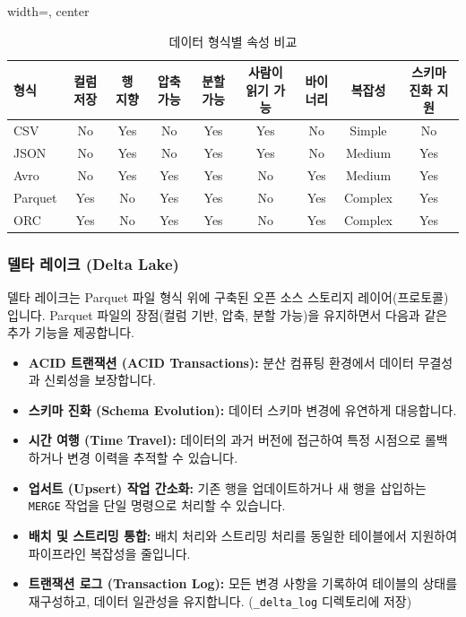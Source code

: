 \documentclass[11pt,a4paper]{article}
\theoremstyle{definition}
\newcommand{\code}[1]{\texttt{#1}}
\begin{document}
\begin{table}[h!]
\centering
\caption{데이터 형식별 속성 비교}
\label{tab:data_format_properties}
\begin{adjustbox}{width=\textwidth, center}
\begin{tabular}{lcccccccc}
\toprule
\textbf{형식} & \textbf{컬럼 저장} & \textbf{행 지향} & \textbf{압축 가능} & \textbf{분할 가능} & \textbf{사람이 읽기 가능} & \textbf{바이너리} & \textbf{복잡성} & \textbf{스키마 진화 지원} \\
\midrule
CSV & No & Yes & No & Yes & Yes & No & Simple & No \\
JSON & No & Yes & No & Yes & Yes & No & Medium & Yes \\
Avro & No & Yes & Yes & Yes & No & Yes & Medium & Yes \\
Parquet & Yes & No & Yes & Yes & No & Yes & Complex & Yes \\
ORC & Yes & No & Yes & Yes & No & Yes & Complex & Yes \\
\bottomrule
\end{tabular}
\end{adjustbox}
\end{table}

\subsubsection{델타 레이크 (Delta Lake)}
델타 레이크는 Parquet 파일 형식 위에 구축된 오픈 소스 스토리지 레이어(프로토콜)입니다. Parquet 파일의 장점(컬럼 기반, 압축, 분할 가능)을 유지하면서 다음과 같은 추가 기능을 제공합니다.

\begin{itemize}
    \item \textbf{ACID 트랜잭션 (ACID Transactions):} 분산 컴퓨팅 환경에서 데이터 무결성과 신뢰성을 보장합니다.
    \item \textbf{스키마 진화 (Schema Evolution):} 데이터 스키마 변경에 유연하게 대응합니다.
    \item \textbf{시간 여행 (Time Travel):} 데이터의 과거 버전에 접근하여 특정 시점으로 롤백하거나 변경 이력을 추적할 수 있습니다.
    \item \textbf{업서트 (Upsert) 작업 간소화:} 기존 행을 업데이트하거나 새 행을 삽입하는 \code{MERGE} 작업을 단일 명령으로 처리할 수 있습니다.
    \item \textbf{배치 및 스트리밍 통합:} 배치 처리와 스트리밍 처리를 동일한 테이블에서 지원하여 파이프라인 복잡성을 줄입니다.
    \item \textbf{트랜잭션 로그 (Transaction Log):} 모든 변경 사항을 기록하여 테이블의 상태를 재구성하고, 데이터 일관성을 유지합니다. (\code{\_delta\_log} 디렉토리에 저장)
\end{itemize}
\end{document}
